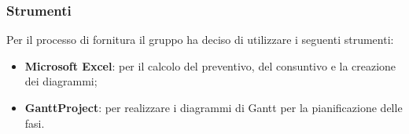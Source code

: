 \subsubsection{Strumenti}
Per il processo di fornitura il gruppo ha deciso di utilizzare i seguenti strumenti:
\begin{itemize}
    \item \textbf{Microsoft Excel}: per il calcolo del preventivo, del consuntivo e la creazione dei diagrammi;
    \item \textbf{GanttProject}: per realizzare i diagrammi di Gantt per la pianificazione delle fasi.
\end{itemize}
